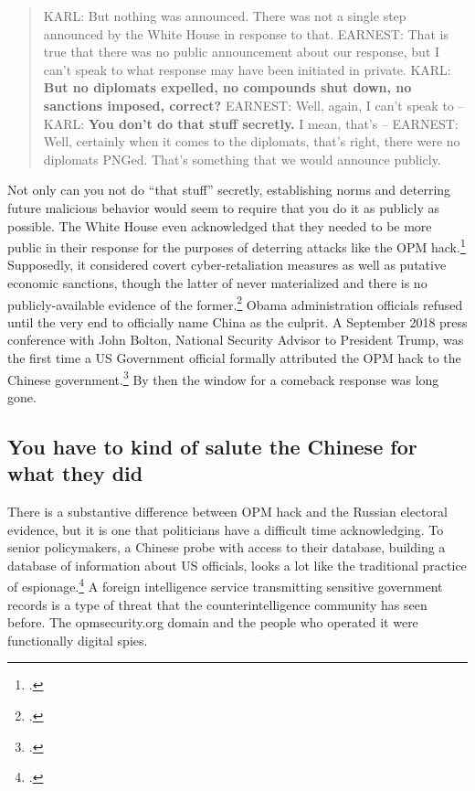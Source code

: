 \documentclass{memoir}
\begin{document}
\begin{refsegment}
\begin{quote}
KARL: But nothing was announced. There was not a single step announced by the White House in response to that.
\newline \newline
EARNEST: That is true that there was no public announcement about our response, but I can't speak to what response may have been initiated in private.
\newline \newline
KARL: \textbf{But no diplomats expelled, no compounds shut down, no sanctions imposed, correct?}
\newline \newline
EARNEST: Well, again, I can't speak to --
\newline \newline
KARL: \textbf{You don't do that stuff secretly.}  I mean, that's --
\newline \newline
EARNEST: Well, certainly when it comes to the diplomats, that's right, there were no diplomats PNGed. That's something that we would announce publicly.
\end{quote}

Not only can you not do ``that stuff'' secretly, establishing norms and deterring future malicious behavior would seem to require that you do it as publicly as possible. The White House even acknowledged that they needed to be more public in their response for the purposes of deterring attacks like the OPM hack.\footcite{sanger_u.s._2016} Supposedly, it considered covert cyber-retaliation measures as well as putative economic sanctions, though the latter of never materialized and there is no publicly-available evidence of the former.\footcite{nakashima_hacks_2015} Obama administration officials refused until the very end to officially name China as the culprit. A September 2018 press conference with John Bolton, National Security Advisor to President Trump, was the first time a US Government official formally attributed the OPM hack to the Chinese government.\footcite{sanger_trump_2018} By then the window for a comeback response was long gone.

\subsection{You have to kind of salute the Chinese for what they did}
There is a substantive difference between OPM hack and the Russian electoral evidence, but it is one that politicians have a difficult time acknowledging. To senior policymakers, a Chinese probe with access to their database, building a database of information about US officials, looks a lot like the traditional practice of espionage.\footcite{nakashima_chinese_2015} A foreign intelligence service transmitting sensitive government records is a type of threat that the counterintelligence community has seen before. The opmsecurity.org domain and the people who operated it were functionally digital spies.


\end{refsegment}
\end{document}

